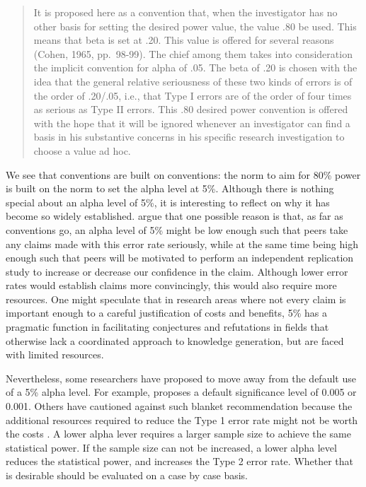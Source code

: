 \documentclass[
  oneside]{book}
\begin{document}
\begin{quote}
It is proposed here as a convention that, when the investigator has no other basis for setting the desired power value, the value .80 be used. This means that beta is set at .20. This value is offered for several reasons (Cohen, 1965, pp.~98-99). The chief among them takes into consideration the implicit convention for alpha of .05. The beta of .20 is chosen with the idea that the general relative seriousness of these two kinds of errors is of the order of .20/.05, i.e., that Type I errors are of the order of four times as serious as Type II errors. This .80 desired power convention is offered with the hope that it will be ignored whenever an investigator can find a basis in his substantive concerns in his specific research investigation to choose a value ad hoc.
\end{quote}

We see that conventions are built on conventions: the norm to aim for 80\% power is built on the norm to set the alpha level at 5\%. Although there is nothing special about an alpha level of 5\%, it is interesting to reflect on why it has become so widely established. \citet{uygun_tunc_epistemic_2021} argue that one possible reason is that, as far as conventions go, an alpha level of 5\% might be low enough such that peers take any claims made with this error rate seriously, while at the same time being high enough such that peers will be motivated to perform an independent replication study to increase or decrease our confidence in the claim. Although lower error rates would establish claims more convincingly, this would also require more resources. One might speculate that in research areas where not every claim is important enough to a careful justification of costs and benefits, 5\% has a pragmatic function in facilitating conjectures and refutations in fields that otherwise lack a coordinated approach to knowledge generation, but are faced with limited resources.

Nevertheless, some researchers have proposed to move away from the default use of a 5\% alpha level. For example, \citet{johnson_revised_2013} proposes a default significance level of 0.005 or 0.001. Others have cautioned against such blanket recommendation because the additional resources required to reduce the Type 1 error rate might not be worth the costs \citep{lakens_justify_2018}. A lower alpha lever requires a larger sample size to achieve the same statistical power. If the sample size can not be increased, a lower alpha level reduces the statistical power, and increases the Type 2 error rate. Whether that is desirable should be evaluated on a case by case basis.
\end{document}
